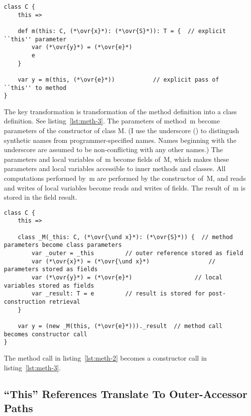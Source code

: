 \begin{lstlisting}[float=htbp, caption={Method Transformation 2 (Explicit This)}, label={lst:meth-2}]
class C {
	this =>

	def m(this: C, (*\ovr{x}*): (*\ovr{S}*)): T = {  // explicit ``this'' parameter
		var (*\ovr{y}*) = (*\ovr{e}*)
		e
	}

	var y = m(this, (*\ovr{e}*))           // explicit pass of ``this'' to method
}
\end{lstlisting}

The key transformation is transformation of the method definition into a class definition. See listing~\ref{lst:meth-3}.
The parameters of method~{\cd m} become parameters of the constructor of class {\cd \und M}. (I use the underscore \mbox{({\cd \und})} to distingush synthetic names from programmer-specified names. Names beginning with the underscore are assumed to be non-conflicting with any other names.)
The parameters and local variables of~{\cd m} become fields of~{\cd \und M}, which makes these parameters and local variables accessible to inner methods and classes.
All computations performed by~{\cd m} are performed by the constructor of~{\cd \und M}, and reads and writes of local variables become reads and writes of fields.
The result of~{\cd m} is stored in the field {\cd \und result}.

\begin{lstlisting}[float=htbp, caption={Method Transformation 3 (Closure)}, label={lst:meth-3}]
class C {
	this =>

	class _M(_this: C, (*\ovr{\und x}*): (*\ovr{S}*)) {  // method parameters become class parameters
		var _outer = _this         // outer reference stored as field
		var (*\ovr{x}*) = (*\ovr{\und x}*)                 // parameters stored as fields
		var (*\ovr{y}*) = (*\ovr{e}*)                  // local variables stored as fields
		var _result: T = e         // result is stored for post-construction retrieval
	}

	var y = (new _M(this, (*\ovr{e}*)))._result  // method call becomes constructor call
}
\end{lstlisting}

The method call in listing~\ref{lst:meth-2} becomes a constructor call in listing~\ref{lst:meth-3}. 

% 

\subsection{``This'' References Translate To Outer-Accessor Paths}

